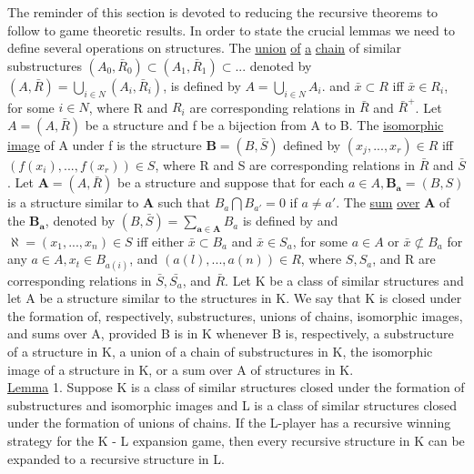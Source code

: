 \documentclass[twoside]{article}
\begin{document}
The reminder of this section is devoted to reducing the recursive
theorems to follow to game theoretic results.    In order to state the crucial
lemmas we need to define several operations on structures. The \underline{union} \underline{of} \underline{a}
\underline{chain} of similar substructures $(A_0,\bar{R}_0) \subset (A_1,\bar{R}_1) \subset ...$ denoted by
$(A,\bar{R}) =  \bigcup_{i\in N}(A_i,\bar{R}_i)$,  is defined by   $A = \bigcup_{i\in N} A_i$. and   $\bar{x} \subset R$ iff $\bar{x} \in R_i$, for
some   $i \in N$, where   R   and   $R_i$    are corresponding relations in   $\bar{R}$   and   $\bar{R}^+$.
Let   $A = (A,\bar{R})$   be a structure and   f   be   a bijection from A to   B. The
\newcommand{\meph}{\mathbf}
\underline{isomorphic} \underline{image} of A under f is the structure   $\meph{B} = (B,\bar{S})$ defined by
$(x_j,...,x_r)\in R$ iff $(f(x_i),...,f(x_r)) \in S$, where   R   and   S   are corresponding
relations in   $\bar{R}$   and  $\bar{S}$. Let   $\meph{A} = (A,\bar{R})$   be a structure and suppose that for
each   $a\in A, \meph{B_a}   = (B, S)$ is a structure similar to $\meph{A}$ such that $B_a \bigcap B_{a'} = 0$ if $a \neq a'$.
The \underline{sum} \underline{over}   $\meph{A}$   of the $\meph{B_a}$, denoted by   $(B,\bar{S}) =  \sum_{\meph{a}\in \meph{A}} B_a$   is defined by
and $\aleph = (x_1,..., x_n)\in S$ iff either $\bar{x} \subset B_a$   and $\bar{x} \in S_a$, for some $a \in A$
or $\bar{x} \not \subset B_a$   for any $a \in A, x_t \in B_{a(i)}$, and   $(a(l),. .. ,a(n)) \in R$,   where   $S, S_a$, and
R   are corresponding relations in $\bar{S}, \bar{S_a}$, and $\bar{R}$.
Let K be a   class	of similar structures and let A be a structure similar to the structures in	K. 
We say that   K   is closed under the formation of, respectively, substructures,
unions of chains, isomorphic images, and sums over   A, provided   B	is in K
whenever   B   is, respectively, a substructure of a structure in   K,	a union of
a chain of substructures in   K, the isomorphic image of a structure	in   K, or
a sum over A   of structures in K.\\
\newline
\underline{Lemma} 1.   Suppose   K   is a class of similar structures closed under	the
formation of substructures and isomorphic images and   L   is a class	of similar
structures closed under the formation of unions of chains.    If the	L-player
has a recursive winning strategy for the   K - L   expansion game,  then every
recursive structure in   K   can be expanded to a recursive structure	in L.\\
\end{document}
